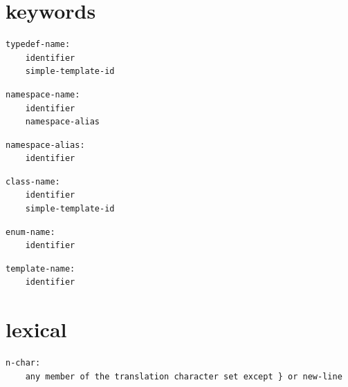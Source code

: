 
\section{keywords}

\noindent\textbf{\texttt{}}\par
\begin{lstlisting}
typedef-name:
    identifier
    simple-template-id
\end{lstlisting}

\noindent\textbf{\texttt{}}\par
\begin{lstlisting}
namespace-name:
    identifier
    namespace-alias
\end{lstlisting}

\noindent\textbf{\texttt{}}\par
\begin{lstlisting}
namespace-alias:
    identifier
\end{lstlisting}

\noindent\textbf{\texttt{}}\par
\begin{lstlisting}
class-name:
    identifier
    simple-template-id
\end{lstlisting}

\noindent\textbf{\texttt{}}\par
\begin{lstlisting}
enum-name:
    identifier
\end{lstlisting}

\noindent\textbf{\texttt{}}\par
\begin{lstlisting}
template-name:
    identifier
\end{lstlisting}

\section{lexical}

\noindent\textbf{\texttt{}}\par
\begin{lstlisting}
n-char:
    any member of the translation character set except } or new-line
\end{lstlisting}

